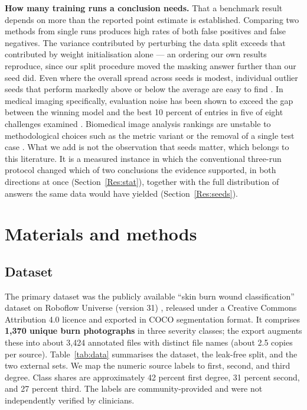 \documentclass{melba}
\begin{document}
\textbf{How many training runs a conclusion needs.} That a benchmark result depends on more than the reported point estimate is established. Comparing two methods from single runs produces high rates of both false positives and false negatives. The variance contributed by perturbing the data split exceeds that contributed by weight initialisation alone \citep{bouthillier2021} --- an ordering our own results reproduce, since our split procedure moved the masking answer further than our seed did. Even where the overall spread across seeds is modest, individual outlier seeds that perform markedly above or below the average are easy to find \citep{picard2021}. In medical imaging specifically, evaluation noise has been shown to exceed the gap between the winning model and the best 10 percent of entries in five of eight challenges examined \citep{varoquaux2022}. Biomedical image analysis rankings are unstable to methodological choices such as the metric variant or the removal of a single test case \citep{maierhein2018}. What we add is not the observation that seeds matter, which belongs to this literature. It is a measured instance in which the conventional three-run protocol changed which of two conclusions the evidence supported, in both directions at once (Section~\ref{Res:stat}), together with the full distribution of answers the same data would have yielded (Section~\ref{Res:seeds}).

\section{Materials and methods}
\label{Mat}
\subsection{Dataset}
\label{Mat:data}
The primary dataset was the publicly available ``skin burn wound classification'' dataset on Roboflow Universe (version 31) \citep{roboflow}, released under a Creative Commons Attribution 4.0 licence and exported in COCO segmentation format. It comprises \textbf{1{,}370 unique burn photographs} in three severity classes; the export augments these into about 3{,}424 annotated files with distinct file names (about 2.5 copies per source). Table~\ref{tab:data} summarises the dataset, the leak-free split, and the two external sets. We map the numeric source labels to first, second, and third degree. Class shares are approximately 42 percent first degree, 31 percent second, and 27 percent third. The labels are community-provided and were not independently verified by clinicians.
\end{document}
